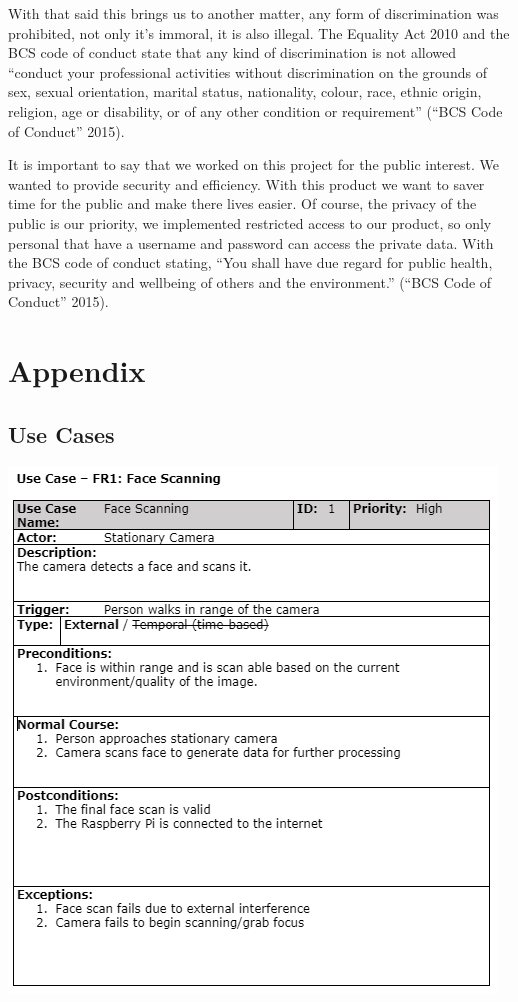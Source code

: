 \documentclass[
  english,
  a4paper,
,tablecaptionabove
]{scrartcl}
\begin{document}
With that said this brings us to another matter, any form of
discrimination was prohibited, not only it's immoral, it is also
illegal. The Equality Act 2010 and the BCS code of conduct state that
any kind of discrimination is not allowed \enquote{conduct your
professional activities without discrimination on the grounds of sex,
sexual orientation, marital status, nationality, colour, race, ethnic
origin, religion, age or disability, or of any other condition or
requirement} (``BCS Code of Conduct'' 2015).

It is important to say that we worked on this project for the public
interest. We wanted to provide security and efficiency. With this
product we want to saver time for the public and make there lives
easier. Of course, the privacy of the public is our priority, we
implemented restricted access to our product, so only personal that have
a username and password can access the private data. With the BCS code
of conduct stating, \enquote{You shall have due regard for public
health, privacy, security and wellbeing of others and the environment.}
(``BCS Code of Conduct'' 2015).

\newpage

\hypertarget{appendix}{%
\section{Appendix}\label{appendix}}

\hypertarget{use-cases}{%
\subsection{Use Cases}\label{use-cases}}

\includegraphics{images/ppm-images/use-case-1.png} \newpage
\end{document}
